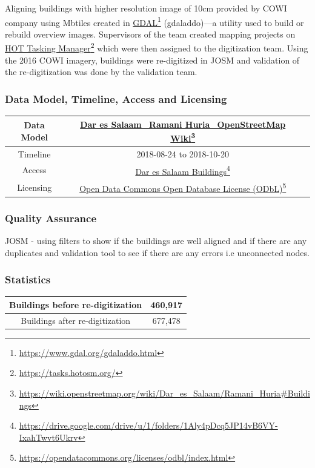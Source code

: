 \documentclass[a4paper,12pt,twoside]{article}
\begin{document}
Aligning buildings with higher resolution image of 10cm provided by COWI company using Mbtiles created in \href{https://www.gdal.org/gdaladdo.html}{GDAL}\footnote{\url{https://www.gdal.org/gdaladdo.html}} (gdaladdo)---a utility used to build or rebuild overview images. Supervisors of the team created mapping projects on \href{https://tasks.hotosm.org/}{HOT Tasking Manager}\footnote{\url{https://tasks.hotosm.org/}} which were then assigned to the digitization team. Using the 2016 COWI imagery, buildings were re-digitized in JOSM and validation of the re-digitization was done by the validation team.

\subsubsection{Data Model, Timeline, Access and Licensing}
\begin{center}
\begin{tabular}{|c|c|c|}  
 \hline
Data Model &
        \href{https://wiki.openstreetmap.org/wiki/Dar_es_Salaam/Ramani_Huria\#Buildings}{Dar es Salaam\_Ramani Huria\_OpenStreetMap Wiki}\footnote{\url{https://wiki.openstreetmap.org/wiki/Dar_es_Salaam/Ramani_Huria\#Buildings}} \\
 \hline
  Timeline  &  2018-08-24 to 2018-10-20 \\
\hline  
 Access  & 
    \href{https://drive.google.com/drive/u/1/folders/1Aly4pDcq5JP14vB6VY-IxahTwvt6Ukrv}{Dar es Salaam Buildings}\footnote{\url{https://drive.google.com/drive/u/1/folders/1Aly4pDcq5JP14vB6VY-IxahTwvt6Ukrv}} \\
   
\hline 
    Licensing & \href{https://opendatacommons.org/licenses/odbl/index.html}{Open Data Commons Open Database License (ODbL)}\footnote{\url{https://opendatacommons.org/licenses/odbl/index.html}} \\
\hline
\end{tabular}
\end{center}

\subsubsection{Quality Assurance}
JOSM - using filters to show if the buildings are well aligned and if there are any duplicates and validation tool to see if there are any errors i.e unconnected nodes.

\subsubsection{Statistics}
\begin{center}
\begin{tabular}{|c|c|}
\hline
   Buildings before re-digitization & 460,917 \\
\hline
   Buildings after re-digitization & 677,478 \\
\hline
\end{tabular}
\end{center}
\end{document}
